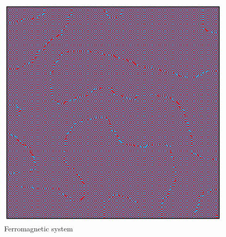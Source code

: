 \begin{figure}[h]
\begin{minipage}[c]{0.32\textwidth}
    \end{minipage}
    \hfill
    \begin{minipage}[c]{0.32\textwidth}
        \centering
        \includegraphics[scale=0.38]{./images/ising/T_n001_ferro.eps}
    \end{minipage}
    \caption{Ferromagnetic system}
    \label{fig:MC_single_final_state_ferro}
\end{figure}
